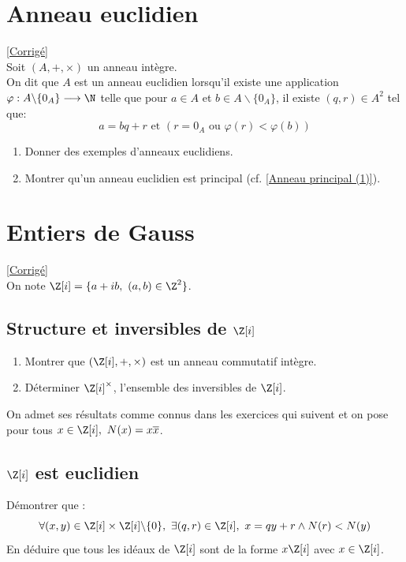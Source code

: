 \documentclass[8pt]{book}
\begin{document}
	\section{Anneau euclidien }
	\label{Anneau euclidien}
	\textcolor{blue}{\hyperref[Anneau euclidien corrigé]{[Corrigé]}}\\
	Soit $(A,+,\times)$ un anneau intègre.\\
	On dit que $A$ est un anneau euclidien lorsqu'il existe une application $\varphi:A\backslash\{0_A\}\longrightarrow \N$ telle que pour $a\in A$ et $b\in A\backslash\{0_A\}$, il existe $(q,r)\in A^2$ tel que:
	$$a=bq+r\text{ et }(r=0_A\text{ ou }\varphi(r)<\varphi(b))$$
	\begin{enumerate}
		\item Donner des exemples d'anneaux euclidiens.
		\item Montrer qu'un anneau euclidien est principal (cf. \ref{Anneau principal (1)}).
	\end{enumerate}
	
	\section{Entiers de Gauss}
	\label{Entiers de Gauss}
	\textcolor{blue}{\hyperref[Entiers de Gauss corrigé]{[Corrigé]}}\\
	On note $\Z[i]=\{a+ib,\ (a,b)\in \Z^2\}$.
	
	\subsection{Structure et inversibles de $\Z[i]$ }
	\begin{enumerate}[leftmargin=*]
		\item Montrer que $(\Z[i],+,\times)$ est un anneau commutatif intègre.
		\item Déterminer $\Z[i]^\times$, l'ensemble des inversibles de $\Z[i]$.
	\end{enumerate}
	On admet ses résultats comme connus dans les exercices qui suivent et on pose pour tous $x\in \Z[i],\ N(x)=x\overline x$.
	
	\subsection{$\Z[i]$ est euclidien }
	Démontrer que :
	$$\forall (x,y)\in \Z[i]\times \Z[i]\backslash\{0\},\ \exists (q,r)\in \Z[i],\ x=qy+r\land N(r)<N(y)$$
	En déduire que tous les idéaux de $\Z[i]$ sont de la forme $x\Z[i]$ avec $x\in \Z[i]$.
	
\end{document}
